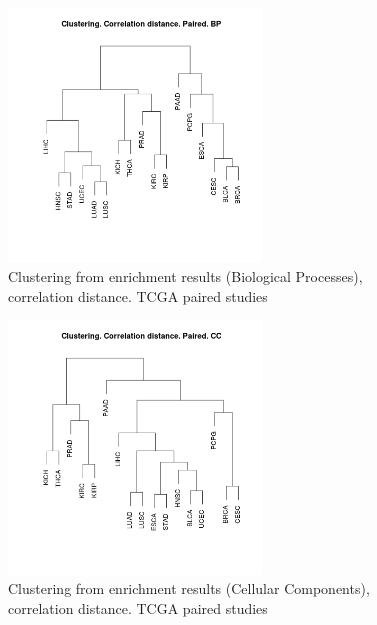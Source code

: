 \documentclass[a4paper,12pt]{article}
\begin{document}
\begin{figure}[!h] 
\centering 
\includegraphics[width=0.6\textwidth]{img/cluster_corelationd_bp_paired.png} 
\caption{Clustering from enrichment results (Biological Processes), correlation distance.  TCGA paired studies} 
\label{figCLUST_corr_bp_paired} 
\end{figure} 

\begin{figure}[!h] 
\centering 
\includegraphics[width=0.6\textwidth]{img/cluster_corelationd_cc_paired.png} 
\caption{Clustering from enrichment results (Cellular Components), correlation distance.  TCGA paired studies} 
\label{figCLUST_corr_cc_paired} 
\end{figure} 
\end{document}
